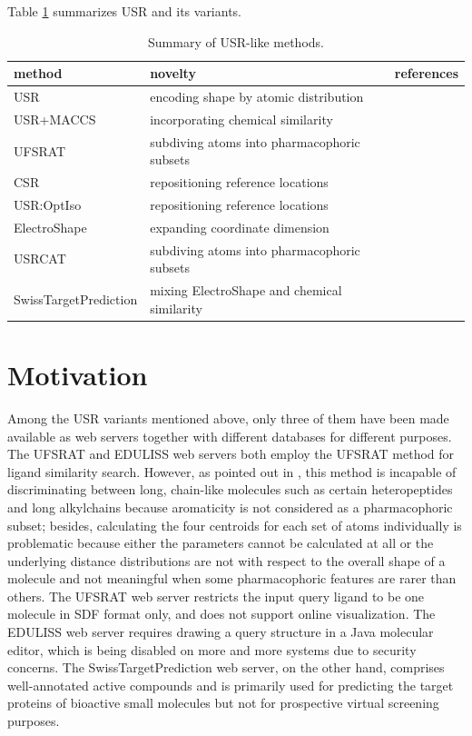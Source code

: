 Table \ref{usr:Methods} summarizes USR and its variants.

\begin{table}
\caption{Summary of USR-like methods.}
\label{usr:Methods}
\begin{tabular}{lll}
\hline
method & novelty & references\\
\hline
USR              & encoding shape by atomic distribution       & \citep{1379}\\
USR+MACCS        & incorporating chemical similarity           & \citep{1333}\\
UFSRAT           & subdiving atoms into pharmacophoric subsets & \citep{1436,1437}\\
CSR              & repositioning reference locations           & \citep{1334}\\
USR:OptIso       & repositioning reference locations           & \citep{1335}\\
ElectroShape     & expanding coordinate dimension              & \citep{1337,1338}\\
USRCAT           & subdiving atoms into pharmacophoric subsets & \citep{1331}\\
SwissTargetPrediction & mixing ElectroShape and chemical similarity & \citep{1407,1408}\\
\hline
\end{tabular}
\end{table}

\section{Motivation}

Among the USR variants mentioned above, only three of them \citep{1436,1437,1408} have been made available as web servers together with different databases for different purposes. The UFSRAT \citep{1436} and EDULISS \citep{1437} web servers both employ the UFSRAT \citep{1436} method for ligand similarity search. However, as pointed out in \citep{1331}, this method is incapable of discriminating between long, chain-like molecules such as certain heteropeptides and long alkylchains because aromaticity is not considered as a pharmacophoric subset; besides, calculating the four centroids for each set of atoms individually is problematic because either the parameters cannot be calculated at all or the underlying distance distributions are not with respect to the overall shape of a molecule and not meaningful when some pharmacophoric features are rarer than others. The UFSRAT \citep{1436} web server restricts the input query ligand to be one molecule in SDF format only, and does not support online visualization. The EDULISS \citep{1437} web server requires drawing a query structure in a Java molecular editor, which is being disabled on more and more systems due to security concerns. The SwissTargetPrediction \citep{1408} web server, on the other hand, comprises well-annotated active compounds and is primarily used for predicting the target proteins of bioactive small molecules but not for prospective virtual screening purposes.

